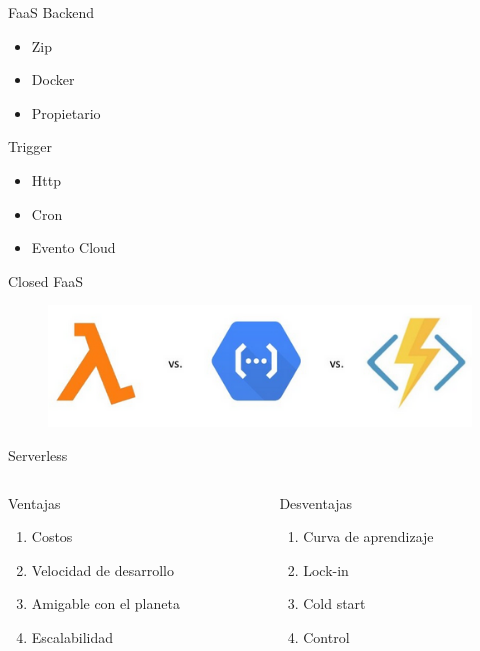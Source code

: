 \documentclass[aspectratio=169]{beamer}
\begin{document}
\begin{frame}{FaaS}
Backend

\begin{itemize}
\item Zip
\item Docker
\item Propietario
\end{itemize}

Trigger
\begin{itemize}
\item Http
\item Cron
\item Evento Cloud
\end{itemize}
\end{frame}

\begin{frame}{Closed FaaS}
\begin{figure}
	\centering
	\includegraphics[width=0.9\linewidth]{Images/closedfaas.png}
	\label{fig:closedfaas}
\end{figure}
\end{frame}

\begin{frame}{Serverless}
	\begin{columns}[T] %

		\begin{column}[T]{6cm} %
Ventajas
		\begin{enumerate}
		\item Costos
		\item Velocidad de desarrollo
		\item Amigable con el planeta
        \item Escalabilidad
		\end{enumerate}
		\end{column}
		\begin{column}[T]{6cm} %
Desventajas
        \begin{enumerate}
        \item Curva de aprendizaje
        \item Lock-in
        \item Cold start
        \item Control
        \end{enumerate}

		\end{column}
	\end{columns}
\end{frame}
\end{document}
